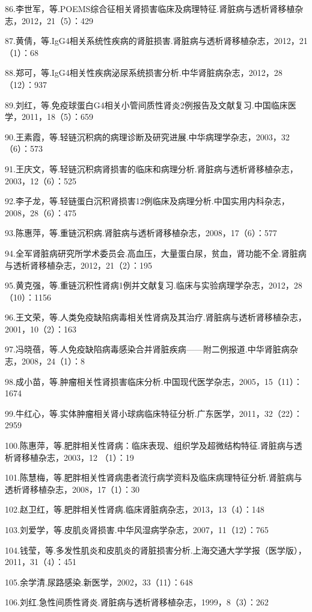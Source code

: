 86.李世军，等.POEMS综合征相关肾损害临床及病理特征.肾脏病与透析肾移植杂志，2012，21（5）：429

87.黄倩，等.IgG4相关系统性疾病的肾脏损害.肾脏病与透析肾移植杂志，2012，21（1）：68

88.郑可，等.IgG4相关性疾病泌尿系统损害分析.中华肾脏病杂志，2012，28（12）：937

89.刘红，等.免疫球蛋白G4相关小管间质性肾炎2例报告及文献复习.中国临床医学，2011，18（5）：659

90.王素霞，等.轻链沉积病的病理诊断及研究进展.中华病理学杂志，2003，32（6）：573

91.王庆文，等.轻链沉积病肾损害的临床和病理分析.肾脏病与透析肾移植杂志，2003，12（6）：525

92.李子龙，等.轻链蛋白沉积肾损害12例临床及病理分析.中国实用内科杂志，2008，28（6）：475

93.陈惠萍，等.重链沉积病.肾脏病与透析肾移植杂志，2008，17（6）：577

94.全军肾脏病研究所学术委员会.高血压，大量蛋白尿，贫血，肾功能不全.肾脏病与透析肾移植杂志，2012，21（2）：195

95.黄克强，等.重链沉积性肾病1例并文献复习.临床与实验病理学杂志，2012，28（10）：1156

96.王文荣，等.人类免疫缺陷病毒相关性肾病及其治疗.肾脏病与透析肾移植杂志，2001，10（2）：163

97.冯晓蓓，等.人免疫缺陷病毒感染合并肾脏疾病------附二例报道.中华肾脏病杂志，2008，24（1）：8

98.成小苗，等.肿瘤相关性肾损害临床分析.中国现代医学杂志，2005，15（11）：1674

99.牛红心，等.实体肿瘤相关肾小球病临床特征分析.广东医学，2011，32（22）：2959

100.陈惠萍，等.肥胖相关性肾病：临床表现、组织学及超微结构特征.肾脏病与透析肾移植杂志，2003，12
（1）：19

101.陈慧梅，等.肥胖相关性肾病患者流行病学资料及临床病理特征分析.肾脏病与透析肾移植杂志，2008，17（1）：30

102.赵卫红，等.肥胖相关性肾病.临床肾脏病杂志，2013，13（4）：148

103.刘爱学，等.皮肌炎肾损害.中华风湿病学杂志，2007，11（12）：765

104.钱莹，等.多发性肌炎和皮肌炎的肾脏损害分析.上海交通大学学报（医学版），2011，31（4）：451

105.余学清.尿路感染.新医学，2002，33（11）：648

106.刘红.急性间质性肾炎.肾脏病与透析肾移植杂志，1999，8（3）：262

